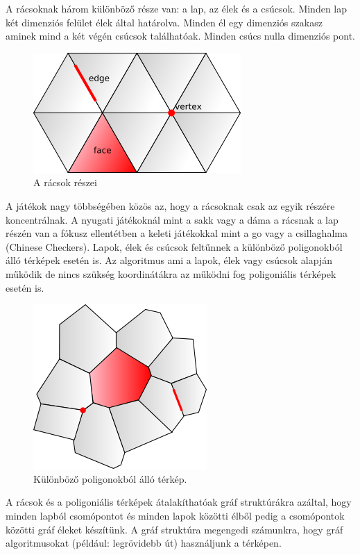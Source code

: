 
A rácsoknak három különböző része van: a lap, az élek és a csúcsok. Minden lap két dimenziós felület élek által határolva. Minden él egy dimenziós szakasz aminek mind a két végén csúcsok találhatóak. Minden csúcs nulla dimenziós pont. 

\begin{figure}[h]
\centering
\includegraphics[scale=0.5]{kepek/img31.png}
\caption{A rácsok részei}
\label{fig:img31}
\end{figure}

\noindent A játékok nagy többségében közös az, hogy a rácsoknak csak az egyik részére koncentrálnak. A nyugati játékoknál mint a sakk vagy a dáma a rácsnak a lap részén van a fókusz ellentétben a keleti játékokkal mint a go vagy a csillaghalma (Chinese Checkers).
\newline
\newline Lapok, élek és csúcsok feltűnnek a különböző poligonokból álló  térképek esetén is. Az algoritmus ami a lapok, élek vagy csúcsok alapján működik de nincs szükség koordinátákra az működni fog poligoniális térképek esetén is.

\begin{figure}[h]
\centering
\includegraphics[scale=0.5]{kepek/img32.png}
\caption{Különböző poligonokból álló térkép.}
\label{fig:img32}
\end{figure}

\noindent A rácsok és a poligoniális térképek átalakíthatóak gráf struktúrákra azáltal, hogy minden lapból csomópontot és minden lapok közötti élből pedig a csomópontok közötti gráf éleket készítünk. A gráf struktúra megengedi számunkra, hogy gráf algoritmusokat (például: legrövidebb út) használjunk a térképen.

